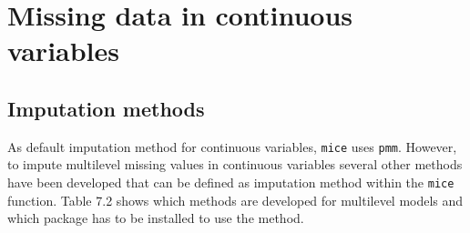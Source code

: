 \documentclass[
]{book}
\begin{document}
\hypertarget{missing-data-in-continuous-variables}{%
\section{Missing data in continuous
variables}\label{missing-data-in-continuous-variables}}

\hypertarget{imputation-methods}{%
\subsection{Imputation methods}\label{imputation-methods}}

As default imputation method for continuous variables, \texttt{mice}
uses \texttt{pmm}. However, to impute multilevel missing values in
continuous variables several other methods have been developed that can
be defined as imputation method within the \texttt{mice} function. Table
7.2 shows which methods are developed for multilevel models and which
package has to be installed to use the method.
\end{document}
